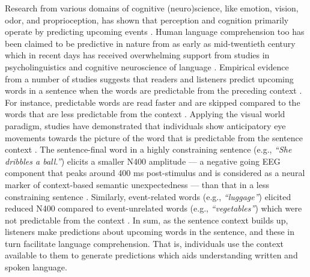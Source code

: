 \documentclass[a4paper, nobind]{templates/ociamthesis}
\begin{document}
Research from various domains of cognitive (neuro)science, like emotion, vision, odor, and proprioception, has shown that perception and cognition primarily operate by predicting upcoming events \autocite{Stadler2012,Clark2013,Seth2013,Marques2018}.
Human language comprehension too has been claimed to be predictive in nature from as early as mid-twentieth century \autocites[e.g.,][]{Miller1951,Mccullough1958,Morton1964}
which in recent days has received overwhelming support from studies in psycholinguistics and cognitive neuroscience of language \autocites[e.g.,][]{Delong2005,Lupyan2015,Pickering2018}.
Empirical evidence from a number of studies suggests that readers and listeners predict upcoming words in a sentence when the words are predictable from the preceding context \autocites[for reviews,][]{Staub2015,Kuperberg2016,Nieuwland2019}.
For instance, predictable words are read faster and are skipped compared to the words that are less predictable from the context \autocite{Ehrlich1981,Frisson2005,Staub2011}.
Applying the visual world paradigm, studies have demonstrated that individuals show anticipatory eye movements towards the picture of the word that is predictable from the sentence context \autocite{Altmann1999,Kamide2003,Ankener2018}.
The sentence-final word in a highly constraining sentence (e.g., \emph{``She dribbles a ball.''}) elicits a smaller N400 amplitude --- a negative going EEG component that peaks around 400 ms post-stimulus and is considered as a neural marker of context-based semantic unexpectedness \autocite{Kutas2011} --- than that in a less constraining sentence \autocites[e.g., \emph{``She buys a ball.''},][]{Kutas1984,Federmeier2007}.
Similarly, event-related words (e.g., \emph{``luggage''}) elicited reduced N400 compared to event-unrelated words (e.g., \emph{``vegetables''}) which were not predictable from the context \autocite[e.g., in an event of \emph{``travel''},][]{Metusalem2012}.
In sum, as the sentence context builds up, listeners make predictions about upcoming words in the sentence, and these in turn facilitate language comprehension.
That is, individuals use the context available to them to generate predictions which aids understanding written and spoken language.
\end{document}
